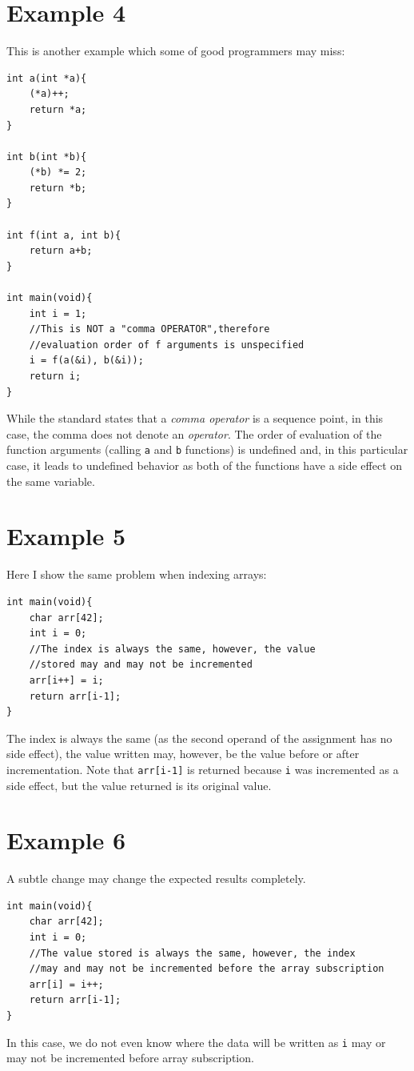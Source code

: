 \section{Example 4}\label{example4}
This is another example which some of good programmers may miss:
\begin{lstlisting}
int a(int *a){
    (*a)++;
    return *a;
}

int b(int *b){
    (*b) *= 2;
    return *b;
}

int f(int a, int b){
    return a+b;
}

int main(void){
    int i = 1;
    //This is NOT a "comma OPERATOR",therefore
    //evaluation order of f arguments is unspecified
    i = f(a(&i), b(&i));
    return i;
}
\end{lstlisting}
While the standard states that a \emph{comma operator} is a sequence point, in this case, the comma does not denote an \emph{operator}. The order of evaluation of the function arguments (calling \verb|a| and \verb|b| functions) is undefined and, in this particular case, it leads to undefined behavior as both of the functions have a side effect on the same variable.

\section{Example 5}\label{example5}
Here I show the same problem when indexing arrays:
\begin{lstlisting}
int main(void){
    char arr[42];
    int i = 0;
    //The index is always the same, however, the value
    //stored may and may not be incremented
    arr[i++] = i;
    return arr[i-1];
}
\end{lstlisting}
The index is always the same (as the second operand of the assignment has no side effect), the value written may, however, be the value before or after incrementation. Note that \verb|arr[i-1]| is returned because \verb|i| was incremented as a side effect, but the value returned is its original value.

\section{Example 6}\label{example6}
A subtle change may change the expected results completely.
\begin{lstlisting}
int main(void){
    char arr[42];
    int i = 0;
    //The value stored is always the same, however, the index
    //may and may not be incremented before the array subscription
    arr[i] = i++;
    return arr[i-1];
}
\end{lstlisting}
In this case, we do not even know where the data will be written as \verb|i| may or may not be incremented before array subscription.

